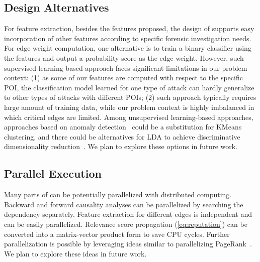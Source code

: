 




\subsection{Design Alternatives}
For feature extraction, besides the features proposed, the design of \tool supports easy incorporation of other features according to specific forensic investigation needs.
%
For edge weight computation, one alternative is to train a binary classifier using the features and output a probability score as the edge weight.
However, such supervised learning-based approach faces significant limitations in our problem context:
(1) as some of our features are computed with respect to the specific POI, the classification model learned for one type of attack can hardly generalize to other types of attacks with different POIs;
(2) such approach typically requires large amount of training data, while our problem context is highly imbalanced in which critical edges are limited. 
%
Among unsupervised learning-based approaches, approaches based on anomaly detection~\cite{anomalysurvey} could be a substitution for KMeans clustering, and there could be alternatives for LDA to achieve discriminative dimensionality reduction~\cite{Mika99fisherdiscriminant,sugiyama2006local}.
We plan to explore these options in future work.



\subsection{Parallel Execution}
Many parts of \tool can be potentially parallelized with distributed computing.
Backward and forward causality analyses can be parallelized by searching the dependency separately. 
Feature extraction for different edges is independent and can be easily parallelized.
Relevance score propagation (\cref{eq:reputation}) can be converted into a matrix-vector product form to save CPU cycles.
Further parallelization is possible by leveraging ideas similar to parallelizing PageRank~\cite{gleich2004fast,kohlschutter2006efficient}. 
We plan to explore these ideas in future work.



